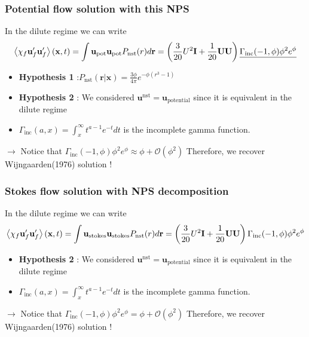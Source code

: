 \documentclass{sintefbeamer}
\begin{document}
\begin{frame}
  \frametitle{Potential flow solution with this NPS}
  In the dilute regime we can write 
  \begin{multline*}
    \left<\chi_f \textbf{u}'_f\textbf{u}'_f\right>(\textbf{x},t)
    = 
    {\int \textbf{u}_\text{pot} \textbf{u}_\text{pot}  
    P_\text{nst}(r) d\textbf{r} }
    =  \left(\frac{3}{20} U^2\textbf{I} + \frac{1}{20}\textbf{UU} \right)
    \underline{\Gamma_\text{inc}(-1,\phi)\phi^2 e^\phi}
  \end{multline*}

  \begin{itemize}
    \item  \textbf{Hypothesis 1} :$P_\text{nst}(\textbf{r}|\textbf{x}) = \frac{3\phi}{4\pi}
    e^{ - \phi (r^3 - 1) }$
    \item \textbf{Hypothesis 2} : We considered $\textbf{u}^\text{nst} = \textbf{u}_\text{potential}$ since it is equivalent in the dilute regime
    \item $\Gamma_\text{inc}(a,x) = \int_x^\infty t^{a-1} e^{-t} dt $ is the incomplete gamma  function. 
  \end{itemize}

  $\to$ Notice that $\Gamma_\text{inc}(-1,\phi)\phi^2 e^\phi \approx  \phi + \mathcal{O}(\phi^2)$ Therefore, we recover  Wijngaarden(1976) solution ! 
\end{frame}
\begin{frame}
  \frametitle{Stokes flow solution with NPS decomposition}
  In the dilute regime we can write 
  \begin{multline*}
    \left<\chi_f \textbf{u}'_f\textbf{u}'_f\right>(\textbf{x},t)
    = 
    {\int \textbf{u}_\text{stokes} \textbf{u}_\text{stokes}  
    P_\text{nst}(r) d\textbf{r} }
    =  \left(\frac{3}{20} U^2\textbf{I} + \frac{1}{20}\textbf{UU} \right)
    \Gamma_\text{inc}(-1,\phi)\phi^2 e^\phi
  \end{multline*}

  \begin{itemize}
    \item \textbf{Hypothesis 2} : We considered $\textbf{u}^\text{nst} = \textbf{u}_\text{potential}$ since it is equivalent in the dilute regime
    \item $\Gamma_\text{inc}(a,x) = \int_x^\infty t^{a-1} e^{-t} dt $ is the incomplete gamma  function. 
  \end{itemize}

  $\to$ Notice that $\Gamma_\text{inc}(-1,\phi)\phi^2 e^\phi =  \phi + \mathcal{O}(\phi^2)$ Therefore, we recover  Wijngaarden(1976) solution ! 
\end{frame}
\end{document}
